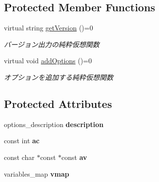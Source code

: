\subsection*{Protected Member Functions}
\begin{DoxyCompactItemize}
\item 
\mbox{\label{class_load_tester_options_a2ba0cddfb94af4d27a1288a04092084d}} 
virtual string \mbox{\hyperlink{class_load_tester_options_a2ba0cddfb94af4d27a1288a04092084d}{get\+Version}} ()=0
\begin{DoxyCompactList}\small\item\em バージョン出力の純粋仮想関数 \end{DoxyCompactList}\item 
\mbox{\label{class_load_tester_options_aab66e27da3f039d38d6cb3a43b222fdc}} 
virtual void \mbox{\hyperlink{class_load_tester_options_aab66e27da3f039d38d6cb3a43b222fdc}{add\+Options}} ()=0
\begin{DoxyCompactList}\small\item\em オプションを追加する純粋仮想関数 \end{DoxyCompactList}\end{DoxyCompactItemize}
\subsection*{Protected Attributes}
\begin{DoxyCompactItemize}
\item 
\mbox{\label{class_load_tester_options_ab0bc9997b16a8e3281375e813b7c3a4a}} 
options\+\_\+description {\bfseries description}
\item 
\mbox{\label{class_load_tester_options_acda9a48699a930b39d3eaf549ad1369c}} 
const int {\bfseries ac}
\item 
\mbox{\label{class_load_tester_options_ad697cf2849316d75b639be09c209e334}} 
const char $\ast$const  $\ast$const {\bfseries av}
\item 
\mbox{\label{class_load_tester_options_a5faf20fdd265664256ab89240ef57dc7}} 
variables\+\_\+map {\bfseries vmap}
\end{DoxyCompactItemize}


